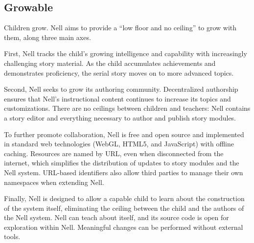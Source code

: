 \documentclass[preprint]{sig-alternate}
\begin{document}
\subsection{Growable}



Children grow.  Nell aims to provide a ``low floor and no ceiling'' to
grow with them, along three main axes.

First, Nell tracks the child's growing intelligence and capability
with increasingly challenging story material.  As the child
accumulates achievements and demonstrates
proficiency, the serial story moves on to more advanced topics.

Second, Nell seeks to grow its authoring community.  Decentralized
authorship ensures that Nell's instructional content
continues to increase its topics and
customizations.  There are no
ceilings between children and teachers: Nell
contains a story editor and everything necessary to
author and publish story modules.

To further promote collaboration,
Nell is free and open source and implemented in standard web
technologies (WebGL, HTML5, and JavaScript) with offline caching.
Resources are named by URL, even when disconnected from the
internet, which simplifies the distribution of updates to story modules and
the Nell system.  URL-based identifiers also allow third parties
to manage their own namespaces when extending Nell.

Finally, Nell is designed to allow a capable child to learn about
the construction of the system itself,
eliminating the ceiling between the child and
the authors of the Nell system.  Nell can teach
about itself, and its source code is open for exploration within Nell.
Meaningful changes can be performed without external tools.
\end{document}
